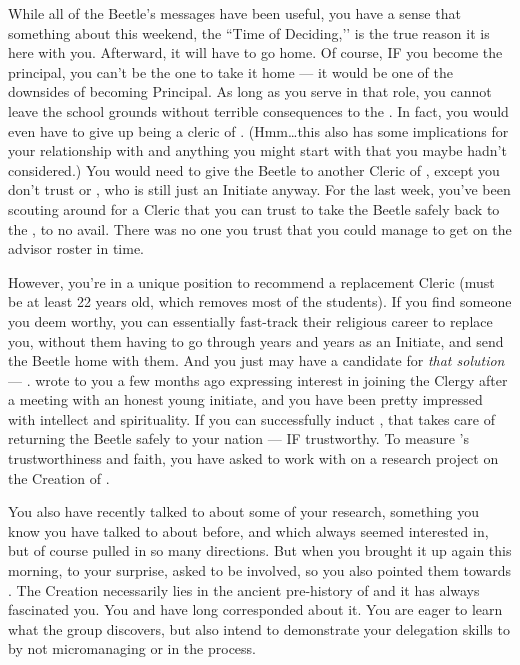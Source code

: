 \documentclass[char]{GL2020}
\begin{document}
While all of the Beetle's messages have been useful, you have a sense that something about this weekend, the ``Time of Deciding,’’ is the true reason it is here with you. Afterward, it will have to go home. Of course, IF you become the principal, you can't be the one to take it home — it would be one of the downsides of becoming Principal. As long as you serve in that role, you cannot leave the school grounds without terrible consequences to the \pSc{}. In fact, you would even have to give up being a cleric of \cTechGod{}. (Hmm\ldots this also has some implications for your relationship with \cJuniorStatesman{} and anything you might start with \cEthics{} that you maybe hadn’t considered.) You would need to give the Beetle to another Cleric of \cTechGod{}, except you don't trust \cAntiChup{} or \cScholarship{}, who is still just an Initiate anyway. For the last week, you've been scouting around for a Cleric that you can trust to take the Beetle safely back to the \pTech{}, to no avail. There was no one you trust that you could manage to get on the advisor roster in time. 

However, you're in a unique position to recommend a replacement Cleric (must be at least 22 years old, which removes most of the students). If you find someone you deem worthy, you can essentially fast-track their religious career to replace you, without them having to go through years and years as an Initiate, and send the Beetle home with them. And you just may have a candidate for \emph{that solution} — \cHeadScientist{\full}. \cHeadScientist{} wrote to you a few months ago expressing interest in joining the Clergy after a meeting with an honest young initiate, and you have been pretty impressed with \cHeadScientist{\their} intellect and spirituality. If you can successfully induct \cHeadScientist{}, that takes care of returning the Beetle safely to your nation — IF \cHeadScientist{\theyare} trustworthy. To measure \cHeadScientist{}'s trustworthiness and faith, you have asked  \cHeadScientist{\them} to work with \cEbbPriest{} on a research project on the Creation of \pEarth{}. 

You also have recently talked to \cLibrarian{\full} about some of your research, something you know you have talked to \cLibrarian{} about before, and which \cLibrarian{\they} always seemed interested in, but of course pulled in so many directions. But when you brought it up again this morning, to your surprise, \cLibrarian{\they} asked to be involved, so you also pointed them towards \cEbbPriest{}. The Creation necessarily lies in the ancient pre-history of \pEarth{} and it has always fascinated you. You and \cEbbPriest{} have long corresponded about it. You are eager to learn what the group discovers, but also intend to demonstrate your delegation skills to \cPrincipal{} by not micromanaging \cHeadScientist{} or \cLibrarian{} in the process.
\end{document}
